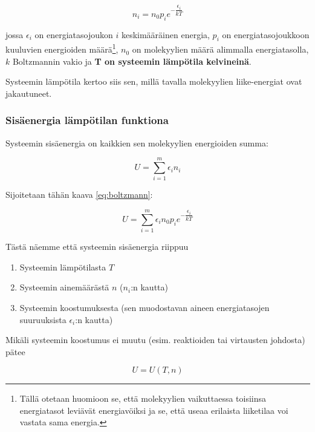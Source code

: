 \documentclass[12pt,a4paper,finnish]{book}
\begin{document}
\begin{equation}
\label{eq:boltzmann}
 n_i = n_0p_ie^{-\dfrac{\epsilon_i}{kT}}
\end{equation}

jossa $\epsilon_i$ on energiatasojoukon $i$ keskimääräinen energia, $p_i$ on energiatasojoukkoon kuuluvien energioiden 
määrä\footnote{Tällä otetaan huomioon se, että molekyylien vaikuttaessa toisiinsa energiatasot leviävät energiavöiksi ja 
se, että useaa erilaista liiketilaa voi vastata sama energia.}, $n_0$ on molekyylien määrä alimmalla 
energiatasolla, $k$ Boltzmannin vakio ja \textbf{T on systeemin lämpötila kelvineinä}.


Systeemin lämpötila kertoo siis sen, millä tavalla molekyylien liike-energiat ovat jakautuneet.

\subsubsection{Sisäenergia lämpötilan funktiona}

Systeemin sisäenergia on kaikkien sen molekyylien energioiden summa:

\begin{equation}
 U = \sum_{i=1}^m\epsilon_in_i
\end{equation}

Sijoitetaan tähän kaava \ref{eq:boltzmann}:

\begin{equation}
 U = \sum_{i=1}^m\epsilon_in_0p_ie^{-\dfrac{\epsilon_i}{kT}}
\end{equation}

Tästä näemme että systeemin sisäenergia riippuu

\begin{enumerate}
 \item Systeemin lämpötilasta $T$
 \item Systeemin ainemäärästä $n$ ($n_i$:n kautta)
 \item Systeemin koostumuksesta (sen muodostavan aineen energiatasojen suuruuksista $\epsilon_i$:n kautta)
\end{enumerate}

Mikäli systeemin koostumus ei muutu (esim. reaktioiden tai virtausten johdosta) pätee

\begin{equation}
 U = U(T, n)
\end{equation}
\end{document}
